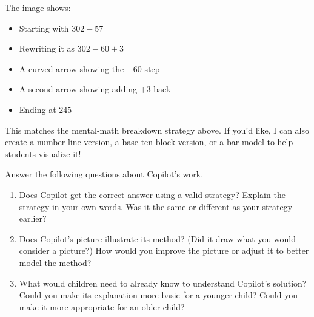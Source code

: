 \documentclass[nooutcomes,noauthor,handout]{ximera}
\begin{document}
\begin{problem}
\begin{explanation}
		The image shows:
		\begin{itemize}
			\item Starting with $302 - 57$
			\item Rewriting it as $302 - 60 + 3$
			\item A curved arrow showing the $-60$ step
			\item A second arrow showing adding $+3$ back
			\item  Ending at $245$
			\end{itemize}
This matches the mental‑math breakdown strategy above. If you'd like, I can also create a number line version, a base‑ten block version, or a bar model to help students visualize it!

\end{explanation}

	
Answer the following questions about Copilot's work.
\begin{enumerate}
\item Does Copilot get the correct answer using a valid strategy? Explain the strategy in your own words. Was it the same or different as your strategy earlier?
\item Does Copilot's picture illustrate its method? (Did it draw what you would consider a picture?) How would you improve the picture or adjust it to better model the method?
\item What would children need to already know to understand Copilot's solution? Could you make its explanation more basic for a younger child? Could you make it more appropriate for an older child?
\end{enumerate}

\end{problem}
\end{document}
